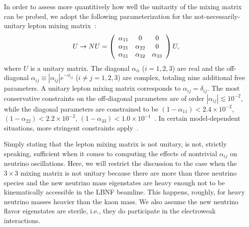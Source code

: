 \documentclass[aps,prd,onecolumn,nofootinbib,superscriptaddress, 11pt]{revtex4}
\begin{document}
In order to assess more quantitively how well the unitarity of the mixing matrix can be probed, we adopt the following parameterization for the not-necessarily-unitary lepton mixing matrix~\cite{Escrihuela:2015wra}:
\begin{equation}
U \to NU = \left(\begin{array}{c c c}\alpha_{11} & 0 & 0 \\ \alpha_{21} & \alpha_{22} & 0 \\ \alpha_{31} & \alpha_{32} & \alpha_{33} \\ \end{array}\right) U, \label{eq:NonUnitary}
\end{equation}
where $U$ is a unitary matrix. The diagonal $\alpha_{ii}$ ($i=1,2,3$) are real and the off-diagonal $\alpha_{ij} \equiv |\alpha_{ij}|e^{-\phi_{ij}}$ ($i\neq j=1,2,3$) are complex, totaling nine additional free parameters. A unitary lepton mixing matrix corresponds to $\alpha_{ij}=\delta_{ij}$. The most conservative constraints on the off-diagonal parameters are of order $|\alpha_{ij}| \lesssim 10^{-2}$, while the diagonal parameters are constrained to be $(1-\alpha_{11}) < 2.4 \times 10^{-2}$, $(1-\alpha_{22}) < 2.2 \times 10^{-2}$, $(1-\alpha_{33}) < 1.0 \times 10^{-1}$~\cite{Fernandez-Martinez:2016lgt,Escrihuela:2016ube}. In certain model-dependent situations, more stringent constraints apply~\cite{Declais:1994su,Abe:2014gda,Astier:2003gs,Astier:2001yj,Blennow:2016jkn}.

Simply stating that the lepton mixing matrix is not unitary, is not, strictly speaking, sufficient when it comes to computing the effects of nontrivial $\alpha_{ij}$ on neutrino oscillations. Here, we will restrict the discussion to the case when the $3\times 3$ mixing matrix is not unitary because there are more than three neutrino species and the new neutrino mass eigenstates are heavy enough not to be kinematically accessible in the LBNF beamline. This happens, roughly, for heavy neutrino masses heavier than the kaon mass. We also assume the new neutrino flavor eigenstates are sterile, i.e., they do participate in the electroweak interactions.  
\end{document}
